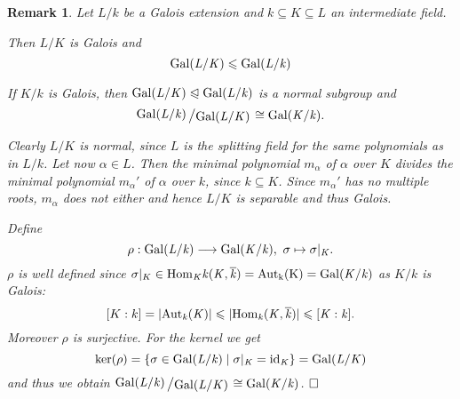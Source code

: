 \documentclass[11pt]{book}
\newtheorem{remark}[theorem]{Remark}
\theoremstyle{nonumberbreak}
\newenvironment{pr}[1][]{\ifthenelse{\equal{#1}{}}{\proof}{\proof[#1]}\rm}{\endproof}
\newcommand{\slant}[2]{{\raisebox{.1em}{$#1$}\left/\raisebox{-.1em}{$#2$}\right.}}
\begin{document}
\begin{spacing}{1.3}
\begin{remark} %
Let $L/k$ be a Galois extension and $k\subseteq K \subseteq L$ an intermediate field.
\begin{compactenum}
\item Then $L/K$ is Galois and $$\rm{Gal}\it(L/K) \leqslant \rm{Gal}\it(L/k)$$
\item If $K/k$ is Galois, then $\rm{Gal}\it(L/K) \trianglelefteqslant \rm{Gal}\it(L/k)$ is a normal subgroup and 
$$\slant{\gal(L/k)}{\gal(L/K)} \cong \gal(K/k).$$
\end{compactenum}
\begin{pr}
\begin{compactenum}
\item Clearly $L/K$ is normal, since $L$ is the splitting field for the same polynomials as in $L/k$.
Let now $\alpha \in L$. Then the minimal polynomial $m_{\alpha}$ of $\alpha$ over $K$ divides the minimal polynomial $m_{\alpha}'$ of $\alpha$ over $k$, since $k \subseteq K$. Since $m_{\alpha}'$ has no multiple roots, $m_{\alpha}$ does not either and hence $L/K$ is separable and thus Galois.
\item Define
$$\rho: \rm{Gal}\it(L/k) \longrightarrow \rm{Gal}\it(K/k), \textrm{ }\sigma \mapsto \sigma |_{K}.$$
$\rho$ is well defined since $\sigma |_{K} \in \rm{Hom}\it_K{k}(K, \overline{k})=\rm{Aut}_{k}(K)=\rm{Gal}\it(K/k)$ as $K/k$ is Galois:
$$ [K:k] = \vert \rm{Aut}\it_{k}(K) \vert  \leqslant \vert \rm{Hom}\it_{k}(K, \overline{k}) \vert \leqslant [K:k].$$
Moreover $\rho$ is surjective. For the kernel we get
$$\ker(\rho)=\{\sigma \in \rm{Gal}\it(L/k) \mid \sigma |_{K} = \textrm{id}_{K} \} = \rm{Gal}\it(L/K)$$
and thus we obtain $\slant{\gal(L/k)}{\gal(L/K)} \cong \gal(K/k)$. $\hfill \Box$
\end{compactenum}
\end{pr}
\end{remark}


\end{spacing}
\end{document}
